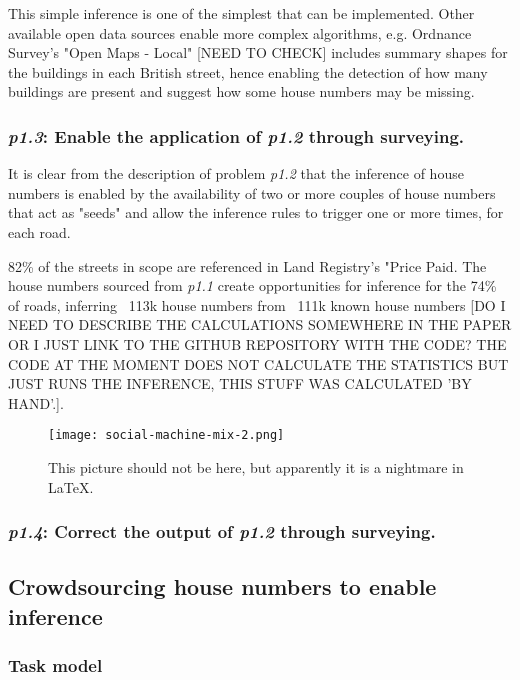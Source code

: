        This simple inference is one of the simplest that can be implemented. Other available open data sources enable more complex algorithms, e.g. Ordnance Survey's "Open Maps - Local" [NEED TO CHECK] includes summary shapes for the buildings in each British street, hence enabling the detection of how many buildings are present and suggest how some house numbers may be missing.
        
    \subsubsection{{\it p1.3}: Enable the application of {\it p1.2} through surveying.} 

        It is clear from the description of problem {\it p1.2} that the inference of house numbers is enabled by the availability of two or more couples of house numbers that act as "seeds" and allow the inference rules to trigger one or more times, for each road.
        
        82\% of the streets in scope are referenced in Land Registry's "Price Paid. The house numbers sourced from {\it p1.1} create opportunities for inference for the 74\% of roads, inferring ~113k house numbers from ~111k known house numbers [DO I NEED TO DESCRIBE THE CALCULATIONS SOMEWHERE IN THE PAPER OR I JUST LINK TO THE GITHUB REPOSITORY WITH THE CODE? THE CODE AT THE MOMENT DOES NOT CALCULATE THE STATISTICS BUT JUST RUNS THE INFERENCE, THIS STUFF WAS CALCULATED 'BY HAND'.].  

        \begin{figure*}
        	\texttt{[image: social-machine-mix-2.png]}
        	\caption{This picture should not be here, but apparently it is a nightmare in LaTeX.}
        	\label{fig:social_machine_mix_2}
        \end{figure*}

    \subsubsection{{\it p1.4}: Correct the output of {\it p1.2} through surveying.} 




\subsection{Crowdsourcing house numbers to enable inference}

    \subsubsection{Task model}
    
